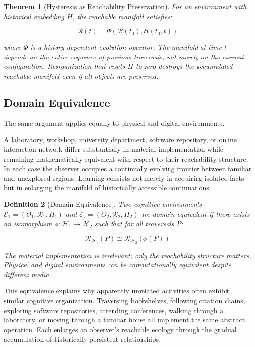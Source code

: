 \documentclass[12pt,oneside]{article}
\newtheorem{definition}{Definition}[section]
\newtheorem{theorem}[definition]{Theorem}
\theoremstyle{remark}
\begin{document}
\begin{theorem}[Hysteresis as Reachability Preservation]
For an environment with historical embedding \(H\), the reachable manifold satisfies:

\[
\mathcal{R}(t) = \Phi(\mathcal{R}(t_0), H(t_0, t))
\]

where \(\Phi\) is a history-dependent evolution operator. The manifold at time \(t\) depends on the entire sequence of previous traversals, not merely on the current configuration. Reorganization that resets \(H\) to zero destroys the accumulated reachable manifold even if all objects are preserved.
\end{theorem}

\subsection{Domain Equivalence}

The same argument applies equally to physical and digital environments.

A laboratory, workshop, university department, software repository, or online interaction network differ substantially in material implementation while remaining mathematically equivalent with respect to their reachability structure. In each case the observer occupies a continually evolving frontier between familiar and unexplored regions. Learning consists not merely in acquiring isolated facts but in enlarging the manifold of historically accessible continuations.

\begin{definition}[Domain Equivalence]
Two cognitive environments \(\mathcal{E}_1 = (O_1, \mathcal{R}_1, H_1)\) and \(\mathcal{E}_2 = (O_2, \mathcal{R}_2, H_2)\) are domain-equivalent if there exists an isomorphism \(\phi: \mathcal{H}_1 \to \mathcal{H}_2\) such that for all traversals \(P\):

\[
\mathcal{R}_{\mathcal{H}_1}(P) \cong \mathcal{R}_{\mathcal{H}_2}(\phi(P))
\]

The material implementation is irrelevant; only the reachability structure matters. Physical and digital environments can be computationally equivalent despite different media.
\end{definition}

This equivalence explains why apparently unrelated activities often exhibit similar cognitive organization. Traversing bookshelves, following citation chains, exploring software repositories, attending conferences, walking through a laboratory, or moving through a familiar house all implement the same abstract operation. Each enlarges an observer's reachable ecology through the gradual accumulation of historically persistent relationships.
\end{document}
